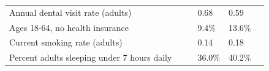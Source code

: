 \documentclass[9pt]{report}
\begin{document}
\begin{tabular}{p{.10in}p{.10in}p{.10in}p{3.7in}>{\hfill}p{.85in}>{\hfill}p{.85in}>{\hfill}p{.85in}>{\hfill}p{.85in}p{0.1in}}
\multicolumn{4}{l}{\parbox{3.6in}{\strut\raggedright{{Annual dental visit rate (adults)}}\strut}} &  &  & 0.68 & 0.59 & \multicolumn{1}{l}{}  \\ 
\multicolumn{4}{l}{\parbox{3.6in}{\strut\raggedright{{Ages 18-64, no health insurance}}\strut}} &  &  & 9.4\% & 13.6\% & \multicolumn{1}{l}{}  \\ 
\multicolumn{4}{l}{\parbox{3.6in}{\strut\raggedright{{Current smoking rate (adults)}}\strut}} &  &  & 0.14 & 0.18 & \multicolumn{1}{l}{}  \\ 
\multicolumn{4}{l}{\parbox{3.6in}{\strut\raggedright{{Percent adults sleeping under 7 hours daily}}\strut}} &  &  & 36.0\% & 40.2\% & \multicolumn{1}{l}{}  \\ 

\end{tabular}
\setlength{\tabcolsep}{6pt} %


\vspace{36pt}
\linespread{1.5}
\theendnotes
\end{document}
